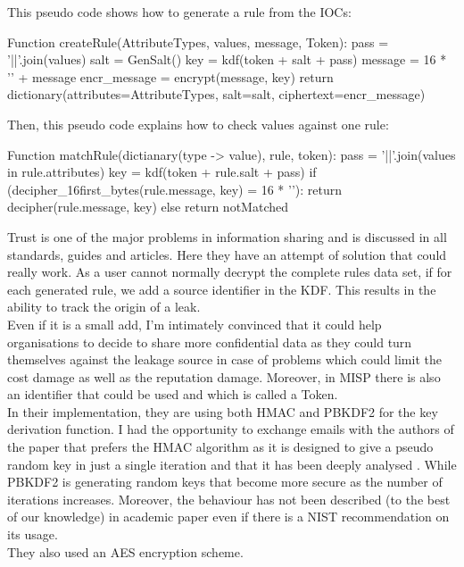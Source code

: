 \documentclass{eplmastersthesis}
\begin{document}
This pseudo code shows how to generate a rule from the IOCs:

\begin{center}
\begin{boxedverbatim}
Function createRule(AttributeTypes, values, message, Token):
        pass = '||'.join(values)
        salt = GenSalt()
        key = kdf(token + salt + pass)
        message = 16 * '' + message
        encr_message = encrypt(message, key)
        return dictionary(attributes=AttributeTypes, 
                            salt=salt,
                            ciphertext=encr_message)
\end{boxedverbatim}
\end{center}

Then, this pseudo code explains how to check values against one rule:
\begin{center}
\begin{boxedverbatim}
Function matchRule(dictianary(type -> value), rule, token):
        pass = '||'.join(values in rule.attributes)
        key = kdf(token + rule.salt + pass)
        if (decipher_16first_bytes(rule.message, key) = 16 * ''):
                return decipher(rule.message, key)
        else
                return notMatched
\end{boxedverbatim}
\end{center}


Trust is one of the major problems in information sharing and is discussed in all standards, guides and articles. Here they have an attempt of solution that could really work. As a user cannot normally decrypt the complete rules data set, if for each generated rule, we add a source identifier in the KDF. This results in the ability to track the origin of a leak. \\
Even if it is a small add, I'm intimately convinced that it could help organisations to decide to share more confidential data as they could turn themselves against the leakage source in case of problems which could limit the cost damage as well as the reputation damage. Moreover, in MISP there is also an identifier that could be used and which is called a Token.\\

In their implementation, they are using both HMAC and PBKDF2 for the key derivation function. I had the opportunity to exchange emails with the authors of the paper that prefers the HMAC algorithm as it is designed to give a pseudo random key in just a single iteration and that it has been deeply analysed \cite{cryptoeprint}. While PBKDF2 is generating random keys that become more secure as the number of iterations increases. Moreover, the behaviour has not been described (to the best of our knowledge) in academic paper even if there is a NIST recommendation on its usage.\\
They also used an AES encryption scheme.\\
\end{document}
